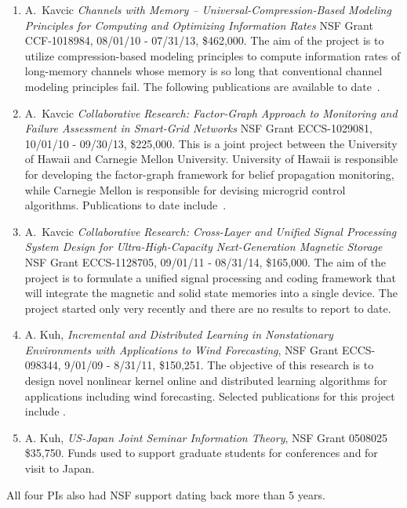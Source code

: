 \begin{enumerate}
\item A.~Kavcic {\em Channels with Memory -- Universal-Compression-Based
    Modeling Principles for Computing and Optimizing Information Rates}
  NSF Grant CCF-1018984, 08/01/10 - 07/31/13, \$462,000. The aim of
  the project is to utilize compression-based modeling principles
  to compute information rates of long-memory channels whose memory
  is so long that conventional channel modeling principles fail. The
  following publications are available to
  date~\cite{Lim11,Yuan11,JS1,JS2,JS3,JS4}.

\item A.~Kavcic {\em Collaborative Research: Factor-Graph Approach to
    Monitoring and Failure Assessment in Smart-Grid Networks}
  NSF Grant ECCS-1029081, 10/01/10 - 09/30/13, \$225,000.
  This is a joint project between the University of Hawaii and
  Carnegie Mellon University. University of Hawaii is responsible
  for developing the factor-graph framework for belief propagation
  monitoring, while Carnegie Mellon is responsible for devising
  microgrid control algorithms. Publications to date
  include~\cite{Hu10,Hu11,Hu11a}.

\item A.~Kavcic {\em Collaborative Research: Cross-Layer and Unified
    Signal Processing System Design for
    Ultra-High-Capacity Next-Generation Magnetic Storage}
  NSF Grant ECCS-1128705, 09/01/11 - 08/31/14, \$165,000.
  The aim of the project is to formulate a unified signal processing
  and coding framework that will integrate the magnetic and solid
  state memories into a single device. The project
  started only very recently and there are no results to report
  to date.

\item A. Kuh, {\em Incremental and Distributed Learning in Nonstationary
    Environments with Applications to Wind Forecasting}, NSF Grant ECCS-098344,
  9/01/09 - 8/31/11, \$150,251.  The objective of this research is to
  design novel nonlinear kernel online and distributed learning algorithms
  for applications including wind forecasting.  Selected publications for
  this project include \cite{kuhetal-10icgc,kowahl-kuh-10ijcnn}.

\item A. Kuh, {\em US-Japan Joint Seminar Information Theory}, NSF Grant 0508025
  \$35,750.  Funds used to support graduate students for conferences and
  for visit to Japan.
\end{enumerate}

All four PIs also had NSF support dating back more than 5 years.
